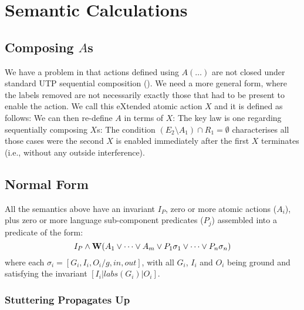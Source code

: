 \section{Semantic Calculations}\label{sec:calc}

\subsection{Composing $A$s}\label{ssec:comp-A}

We have a problem in that actions defined using $A(\dots)$
are not closed under standard UTP sequential composition ().
We need a more general form,
where the labels removed are not necessarily
exactly those that had to be present to enable the action.
We call this eXtended atomic action $X$ and it is defined as follows:
We can then re-define $A$ in terms of $X$:
The key law is one regarding sequentially composing $X$s:
The condition $(E_2\setminus A_1) \cap R_1 = \emptyset$
characterises all those cases were the second $X$ is enabled
immediately after the first $X$ terminates
(i.e., without any outside interference).

\subsection{Normal Form}\label{sec:normal-form}

All the semantics above have an invariant $I_P$,
zero or more atomic actions ($A_i$),
plus zero or more language sub-component predicates ($P_j$)
assembled into a predicate of the form:
\[
  I_P
  \land
  \mathbf{W}( A_1 \lor \dots \lor A_m
     \lor
     P_1\sigma_1 \lor \dots \lor P_n\sigma_n )
\]
where each $\sigma_i = [G_i,I_i,O_i/g,in,out]$,
with all $G_i$, $I_i$ and $O_i$ being ground
and satisfying the invariant $[I_i|labs(G_i)|O_i]$.

\subsubsection{Stuttering Propagates Up}

